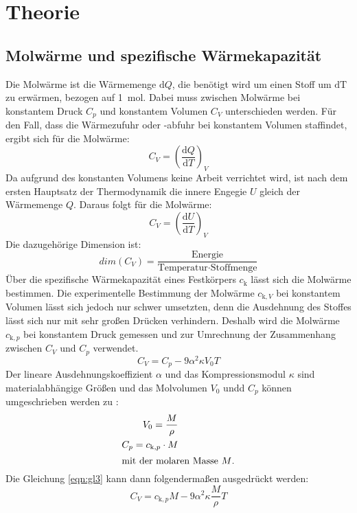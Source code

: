 \section{Theorie}
\label{sec:Theorie}

\subsection{Molwärme und spezifische Wärmekapazität}
\label{sec:molwärme}

Die Molwärme ist die Wärmemenge $\text{d}Q$, die benötigt wird um einen Stoff um $\text{dT}$ zu erwärmen, bezogen auf \SI{1}{\mol}.
Dabei muss zwischen Molwärme bei konstantem Druck $C_p$ und konstantem Volumen $C_V$ unterschieden werden.
Für den Fall, dass die Wärmezufuhr oder -abfuhr bei konstantem Volumen staffindet, ergibt sich für die Molwärme:
\begin{equation}
  C_V = \left(\frac{\text{d}Q}{\text{d}T}\right)_V
  \label{eqn:gl1}
\end{equation}
Da aufgrund des konstanten Volumens keine Arbeit verrichtet wird, ist nach dem ersten Hauptsatz der Thermodynamik die innere Engegie $U$ gleich der Wärmemenge $Q$.
Daraus folgt für die Molwärme:
\begin{equation}
  C_V = \left(\frac{\text{d}U}{\text{d}T}\right)_V
  \label{eqn:gl2}
\end{equation}
Die dazugehörige Dimension ist:
\begin{equation*}
  dim (C_V) = \frac{\text{Energie}}{\text{Temperatur} \cdot \text{Stoffmenge}}
\end{equation*}
Über die spezifische Wärmekapazität eines Festkörpers $c_\text{k}$ lässt sich die Molwärme bestimmen.
Die experimentelle Bestimmung der Molwärme $c_{\text{k},V}$ bei konstantem Volumen lässt sich jedoch nur schwer umsetzten, denn die Ausdehnung des Stoffes lässt sich nur mit sehr großen Drücken verhindern.
Deshalb wird die Molwärme $c_{\text{k},p}$ bei konstantem Druck gemessen und zur Umrechnung der Zusammenhang zwischen $C_V$ und $C_p$ verwendet.
\begin{equation}
  C_V = C_p - 9 \alpha^2 \kappa V_0 T
  \label{eqn:gl3}
\end{equation}
Der lineare Ausdehnungskoeffizient $\alpha$ und das Kompressionsmodul $\kappa$ sind materialabhängige Größen und das Molvolumen $V_0$ undd $C_p$ können umgeschrieben werden zu \cite{Molwärme}:
\begin{align*}
  V_0 = \frac{M}{\rho} \\
  C_p = c_{\text{k},p} \cdot M \\
  \intertext{mit der molaren Masse $M$.}
\end{align*}
Die Gleichung \eqref{eqn:gl3} kann dann folgendermaßen ausgedrückt werden:
\begin{equation}
  C_V = c_{\text{k},p} M - 9 \alpha^2 \kappa \frac{M}{\rho} T
  \label{eqn:gl4}
\end{equation}
